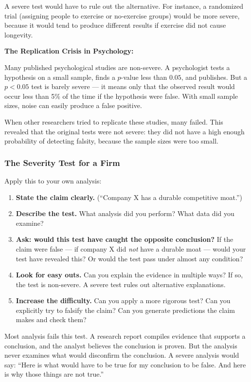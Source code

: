 \documentclass[11pt,letterpaper]{article}
\begin{document}
A severe test would have to rule out the alternative. For instance, a randomized trial (assigning people to exercise or no-exercise groups) would be more severe, because it would tend to produce different results if exercise did not cause longevity.

\textbf{The Replication Crisis in Psychology:}

Many published psychological studies are non-severe. A psychologist tests a hypothesis on a small sample, finds a $p$-value less than $0.05$, and publishes. But a $p < 0.05$ test is barely severe — it means only that the observed result would occur less than 5\% of the time if the hypothesis were false. With small sample sizes, noise can easily produce a false positive.

When other researchers tried to replicate these studies, many failed. This revealed that the original tests were not severe: they did not have a high enough probability of detecting falsity, because the sample sizes were too small.

\subsubsection*{The Severity Test for a Firm}

Apply this to your own analysis:

\begin{enumerate}
  \item \textbf{State the claim clearly.} (``Company X has a durable competitive moat.'')
  \item \textbf{Describe the test.} What analysis did you perform? What data did you examine?
  \item \textbf{Ask: would this test have caught the opposite conclusion?} If the claim were false — if company X did \emph{not} have a durable moat — would your test have revealed this? Or would the test pass under almost any condition?
  \item \textbf{Look for easy outs.} Can you explain the evidence in multiple ways? If so, the test is non-severe. A severe test rules out alternative explanations.
  \item \textbf{Increase the difficulty.} Can you apply a more rigorous test? Can you explicitly try to falsify the claim? Can you generate predictions the claim makes and check them?
\end{enumerate}

Most analysis fails this test. A research report compiles evidence that supports a conclusion, and the analyst believes the conclusion is proven. But the analysis never examines what would disconfirm the conclusion. A severe analysis would say: ``Here is what would have to be true for my conclusion to be false. And here is why those things are not true.''
\end{document}
